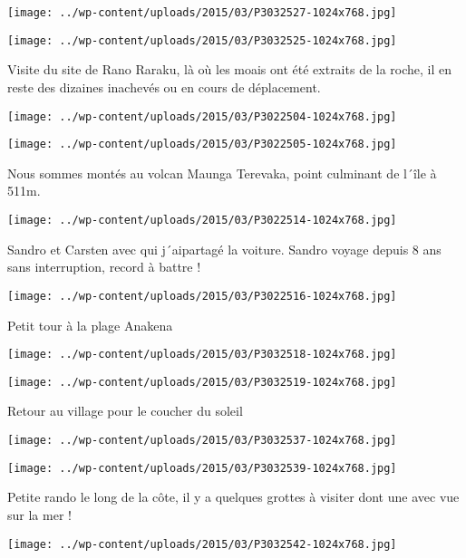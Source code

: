  \newline
 \newline
\centerline{\texttt{[image: ../wp-content/uploads/2015/03/P3032527-1024x768.jpg]} } 
 \newline
\centerline{\texttt{[image: ../wp-content/uploads/2015/03/P3032525-1024x768.jpg]} } 
Visite du site de Rano Raraku, là où les moais ont été extraits de la roche, il en reste des dizaines inachevés ou en cours de déplacement. \newline
 \newline
\centerline{\texttt{[image: ../wp-content/uploads/2015/03/P3022504-1024x768.jpg]} } 
 \newline
\centerline{\texttt{[image: ../wp-content/uploads/2015/03/P3022505-1024x768.jpg]} } 
 \newline
 Nous sommes montés au volcan Maunga Terevaka, point culminant de l´île à 511m. \newline
 \newline
\centerline{\texttt{[image: ../wp-content/uploads/2015/03/P3022514-1024x768.jpg]} } 
 \newline
 Sandro et Carsten avec qui j´aipartagé la voiture. Sandro voyage depuis 8 ans sans interruption, record à battre !\newline
\centerline{\texttt{[image: ../wp-content/uploads/2015/03/P3022516-1024x768.jpg]} } 
Petit tour à la plage Anakena \newline
 \newline
\centerline{\texttt{[image: ../wp-content/uploads/2015/03/P3032518-1024x768.jpg]} } 
 \newline
\centerline{\texttt{[image: ../wp-content/uploads/2015/03/P3032519-1024x768.jpg]} } 
Retour au village pour le coucher du soleil \newline
 \newline
\centerline{\texttt{[image: ../wp-content/uploads/2015/03/P3032537-1024x768.jpg]} } 
 \newline
\centerline{\texttt{[image: ../wp-content/uploads/2015/03/P3032539-1024x768.jpg]} } 
 \newline
 Petite rando le long de la côte, il y a quelques grottes à visiter dont une avec vue sur la mer ! \newline
 \newline
\centerline{\texttt{[image: ../wp-content/uploads/2015/03/P3032542-1024x768.jpg]} } 
